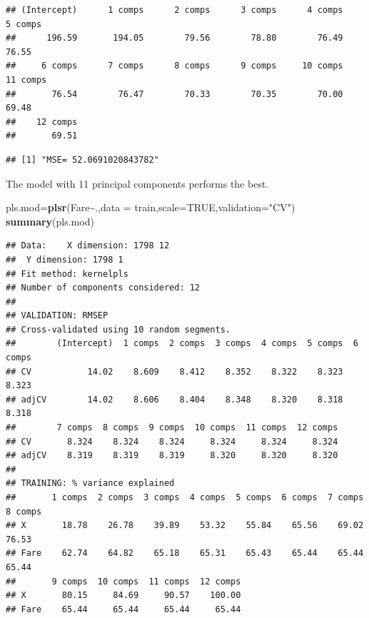 \documentclass[
]{article}
\newenvironment{Shaded}{\begin{snugshade}}{\end{snugshade}}
\newcommand{\AttributeTok}[1]{\textcolor[rgb]{0.13,0.29,0.53}{#1}}
\newcommand{\ConstantTok}[1]{\textcolor[rgb]{0.56,0.35,0.01}{#1}}
\newcommand{\DecValTok}[1]{\textcolor[rgb]{0.00,0.00,0.81}{#1}}
\newcommand{\FunctionTok}[1]{\textcolor[rgb]{0.13,0.29,0.53}{\textbf{#1}}}
\newcommand{\NormalTok}[1]{#1}
\newcommand{\OtherTok}[1]{\textcolor[rgb]{0.56,0.35,0.01}{#1}}
\newcommand{\SpecialCharTok}[1]{\textcolor[rgb]{0.81,0.36,0.00}{\textbf{#1}}}
\newcommand{\StringTok}[1]{\textcolor[rgb]{0.31,0.60,0.02}{#1}}
\begin{document}
\begin{verbatim}
## (Intercept)      1 comps      2 comps      3 comps      4 comps      5 comps  
##      196.59       194.05        79.56        78.80        76.49        76.55  
##     6 comps      7 comps      8 comps      9 comps     10 comps     11 comps  
##       76.54        76.47        70.33        70.35        70.00        69.48  
##    12 comps  
##       69.51
\end{verbatim}

\begin{Shaded}
\end{Shaded}

\begin{verbatim}
## [1] "MSE= 52.0691020843782"
\end{verbatim}

The model with 11 principal components performs the best.

\begin{Shaded}
\begin{Highlighting}[]
\NormalTok{pls.mod}\OtherTok{=}\FunctionTok{plsr}\NormalTok{(Fare}\SpecialCharTok{\textasciitilde{}}\NormalTok{.,}\AttributeTok{data =}\NormalTok{ train,}\AttributeTok{scale=}\ConstantTok{TRUE}\NormalTok{,}\AttributeTok{validation=}\StringTok{"CV"}\NormalTok{)}
\FunctionTok{summary}\NormalTok{(pls.mod)}
\end{Highlighting}
\end{Shaded}

\begin{verbatim}
## Data:    X dimension: 1798 12 
##  Y dimension: 1798 1
## Fit method: kernelpls
## Number of components considered: 12
## 
## VALIDATION: RMSEP
## Cross-validated using 10 random segments.
##        (Intercept)  1 comps  2 comps  3 comps  4 comps  5 comps  6 comps
## CV           14.02    8.609    8.412    8.352    8.322    8.323    8.323
## adjCV        14.02    8.606    8.404    8.348    8.320    8.318    8.318
##        7 comps  8 comps  9 comps  10 comps  11 comps  12 comps
## CV       8.324    8.324    8.324     8.324     8.324     8.324
## adjCV    8.319    8.319    8.319     8.320     8.320     8.320
## 
## TRAINING: % variance explained
##       1 comps  2 comps  3 comps  4 comps  5 comps  6 comps  7 comps  8 comps
## X       18.78    26.78    39.89    53.32    55.84    65.56    69.02    76.53
## Fare    62.74    64.82    65.18    65.31    65.43    65.44    65.44    65.44
##       9 comps  10 comps  11 comps  12 comps
## X       80.15     84.69     90.57    100.00
## Fare    65.44     65.44     65.44     65.44
\end{verbatim}
\end{document}
